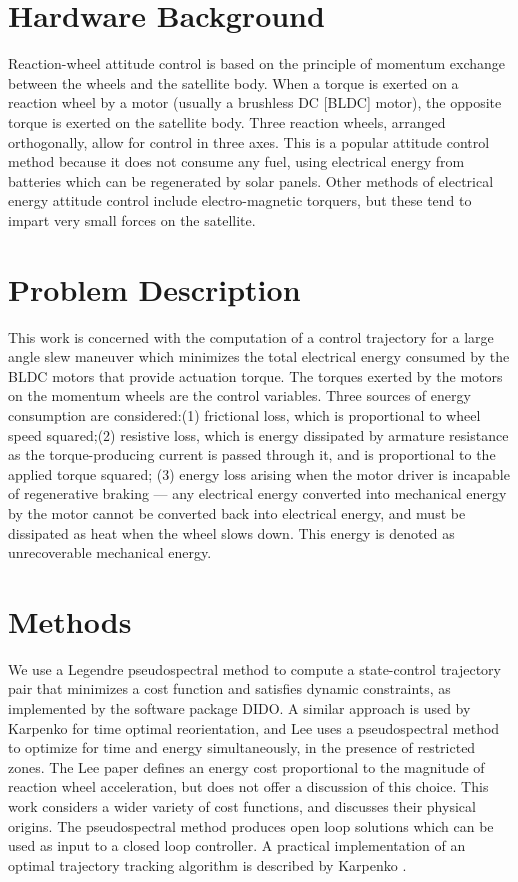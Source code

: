 \documentclass[letterpaper, paper,11pt]{AAS}		%
\begin{document}
\section{Hardware Background}
Reaction-wheel attitude control is based on the principle of momentum exchange between the wheels and the satellite body. When a torque is exerted on a reaction wheel by a motor (usually a brushless DC [BLDC] motor), the opposite torque is exerted on the satellite body. Three reaction wheels, arranged orthogonally, allow for control in three axes. This is a popular attitude control method because it does not consume any fuel, using electrical energy from batteries which can be regenerated by solar panels. Other methods of electrical energy attitude control include electro-magnetic torquers, but these tend to impart very small forces on the satellite.\\


\section{Problem Description}
This work is concerned with the computation of a control trajectory for a large angle slew maneuver which minimizes the total electrical energy consumed by the BLDC motors that provide actuation torque. The torques exerted by the motors on the momentum wheels are the control variables. Three sources of energy consumption are considered:(1) frictional loss, which is proportional to wheel speed squared;(2) resistive loss, which is energy dissipated by armature resistance as the torque-producing current is passed through it, and is proportional to the applied torque squared; (3) energy loss arising when the motor driver is incapable of regenerative braking --- any electrical energy converted into mechanical energy by the motor cannot be converted back into electrical energy, and must be dissipated as heat when the wheel slows down. This energy is denoted as unrecoverable mechanical energy.

\section{Methods}
We use a Legendre pseudospectral method to compute a state-control trajectory pair that minimizes a cost function and satisfies dynamic constraints, as implemented by the software package DIDO\cite{Ross2007}. A similar approach is used by Karpenko \cite{Karpenko2014} for time optimal reorientation, and Lee \cite{Lee2014} uses a pseudospectral method to optimize for time and energy simultaneously, in the presence of restricted zones. The Lee paper defines an energy cost proportional to the magnitude of reaction wheel acceleration, but does not offer a discussion of this choice. This work considers a wider variety of cost functions, and discusses their physical origins. The pseudospectral method produces open loop solutions which can be used as input to a closed loop controller. A practical implementation of an optimal trajectory tracking algorithm is described by Karpenko \cite{Karpenko2014}.
\end{document}
